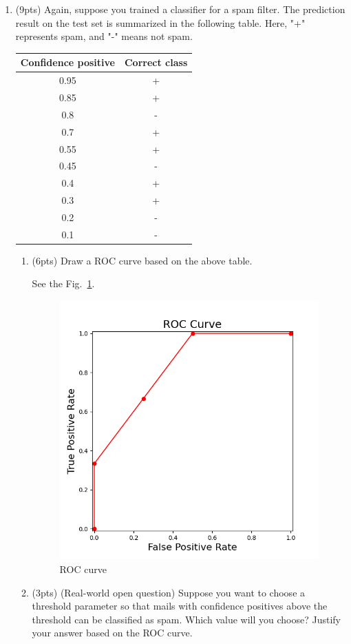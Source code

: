\documentclass[a4paper]{article}
\theoremstyle{definition}
\newenvironment{soln}{
    \leavevmode\color{blue}\ignorespaces
}{}
\begin{document}
\begin{enumerate}
\item (9pts) Again, suppose you trained a classifier for a spam filter. The prediction result on the test set is summarized in the following table. Here, "+" represents spam, and "-" means not spam.

\begin{center}
\begin{tabular}{ c  c }
\hline
Confidence positive & Correct class \\ \hline
0.95 & + \\
0.85 & + \\
0.8 & - \\
0.7 & + \\
0.55 & + \\
0.45 & - \\
0.4 & + \\
0.3 & + \\
0.2 & - \\
0.1 & - \\
\hline
\end{tabular}
\end{center}

\begin{enumerate}
	\item (6pts) Draw a ROC curve based on the above table.
	
	\begin{soln}
	See the Fig.~\ref{fig:roc}.
	\begin{figure}
		\centering
		\includegraphics[width=0.5\linewidth]{images/ROC_q1_5.png}
		\caption{ROC curve}
		\label{fig:roc}
	\end{figure}
	\end{soln}
	
	\item (3pts) (Real-world open question) Suppose you want to choose a threshold parameter so that mails with confidence positives above the threshold can be classified as spam. Which value will you choose? Justify your answer based on the ROC curve.
	

\end{enumerate}
\end{enumerate}
\end{document}
